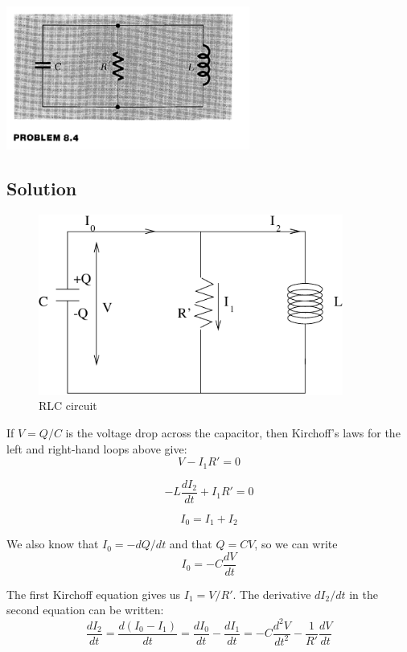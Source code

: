 \documentclass[solutions]{esg8022pset}
\begin{document}
  \begin{center}
    \includegraphics[width = 0.6\textwidth]{figpu804}
  \end{center}
\subsection{Solution}
  \begin{figure}[H]
    \centering
    \includegraphics[width = 10cm]{ps8}
    \caption{RLC circuit}
    \label{fig:graph22.eps}
  \end{figure}

  If $V=Q/C$ is the voltage drop across the capacitor, then Kirchoff's
  laws for the left and right-hand loops above give:
  \begin{equation}
  V-I_1R'=0
  \end{equation}

  \begin{equation}
  -L\frac{dI_2}{dt}+I_1R'=0
  \end{equation}

  \begin{equation}
  I_0=I_1+I_2
  \end{equation}

  We also know that $I_0=-dQ/dt$ and that $Q=CV$, so we can write
  \begin{equation}
  I_0=-C\frac{dV}{dt}
  \end{equation}

  The first Kirchoff equation gives us $I_1=V/R'$. The derivative
  $dI_2/dt$ in the second equation can be written:
  \begin{equation}
  \frac{dI_2}{dt}=\frac{d(I_0-I_1)}{dt}=\frac{dI_0}{dt}-\frac{dI_1}{dt}=-C\frac{d^2V}{dt^2}-\frac{1}{R'}\frac{dV}{dt}
  \end{equation}
\end{document}
